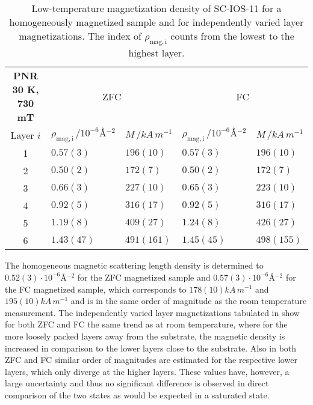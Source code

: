 \documentclass[\main/dresen_thesis.tex]{subfiles}
\begin{document}
  \begin{table}[!htbp]
    \centering
    \caption{\label{tab:looselyPackedNP:layers:pnrSCIOS30K730mT}Low-temperature magnetization density of SC-IOS-11 for a homogeneously magnetized sample and for independently varied layer magnetizations. The index of $\rho_\mathrm{mag, i}$ counts from the lowest to the highest layer.}
    \begin{tabular}{ c | l | l | l | l}
      \rule{0pt}{2ex} \textbf{PNR \@ 30 K, 730 mT}  &  \multicolumn{2}{c}{ZFC} &  \multicolumn{2}{c}{FC} \\
      Layer $i$ & $\rho_\mathrm{mag, i} \, / \unit{10^{-6} \angstrom^{-2}}$ & $M \, / \unit{kA \, m^{-1}}$
                & $\rho_\mathrm{mag, i} \, / \unit{10^{-6} \angstrom^{-2}}$ & $M \, / \unit{kA \, m^{-1}}$\\
      \hline
        1 & $0.57(3)$   & $196(10)$         & $0.57(3)$  & $196(10)$\\
        2 & $0.50(2)$   & $172(7)$          & $0.50(2)$  & $172(7)$\\
        3 & $0.66(3)$   & $227(10)$         & $0.65(3)$  & $223(10)$\\
        4 & $0.92(5)$   & $316(17)$         & $0.92(5)$  & $316(17)$\\
        5 & $1.19(8)$   & $409(27)$         & $1.24(8)$  & $426(27)$\\
        6 & $1.43(47)$  & $491(161)$        & $1.45(45)$ & $498(155)$\\
      \hline
    \end{tabular}
  \end{table}

  The homogeneous magnetic scattering length density is determined to $0.52(3) \cdot \unit{10^{-6} \angstrom^{-2}}$ for the ZFC magnetized sample and $0.57(3) \cdot \unit{10^{-6} \angstrom^{-2}}$ for the FC magnetized sample, which corresponds to $178(10) \unit{kA \, m^{-1}}$ and $195(10) \unit{kA \, m^{-1}}$ and is in the same order of magnitude as the room temperature measurement.
  The independently varied layer magnetizations tabulated in  show for both ZFC and FC the same trend as at room temperature, where for the more loosely packed layers away from the substrate, the magnetic density is increased in comparison to the lower layers close to the substrate.
  Also in both ZFC and FC similar order of magnitudes are estimated for the respective lower layers, which only diverge at the higher layers.
  These values have, however, a large uncertainty and thus no significant difference is observed in direct comparison of the two states as would be expected in a saturated state.
\end{document}
